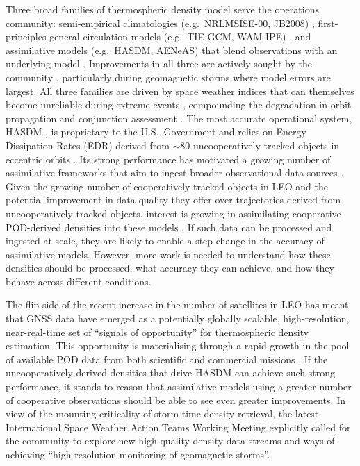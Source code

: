\documentclass[draft]{agujournal2019}
\begin{document}
Three broad families of thermospheric density model serve the operations community: semi-empirical climatologies (e.g.\ NRLMSISE-00, JB2008) \cite{Picone2002NRLMSISE-00Issues, Bowman2008AIndices}, first-principles general circulation models (e.g.\ TIE-GCM, WAM-IPE) \cite{Qian2014TheSystem, Brown2024UsingSolutions}, and assimilative models (e.g.\ HASDM, AENeAS) that blend observations with an underlying model \cite{Bruinsma2023ThermosphereDrag, Elvidge2019UsingModelling}. Improvements in all three are actively sought by the community \cite{Mutschler2023AOperations, Mehta2022SatelliteOperations}, particularly during geomagnetic storms where model errors are largest. All three families are driven by space weather indices that can themselves become unreliable during extreme events \cite{Shprits2019NowcastingObservations, Yamazaki2024AssessmentIndices}, compounding the degradation in orbit propagation and conjunction assessment \cite{Parker2024InfluencesAssessment}. The most accurate operational system, HASDM \cite{Storz2002HASDMRates, Picone2005ThermosphericSets}, is proprietary to the U.S.\ Government and relies on Energy Dissipation Rates (EDR) derived from $\sim$80 uncooperatively-tracked objects in eccentric orbits \cite{Storz2002HASDMRates}. Its strong performance has motivated a growing number of assimilative frameworks that aim to ingest broader observational data sources \cite{Sutton2018AThermosphere, Gondelach2020, Elvidge2019UsingModelling, Brown2024UsingSolutions}. Given the growing number of cooperatively tracked objects in LEO and the potential improvement in data quality they offer over trajectories derived from uncooperatively tracked objects, interest is growing in assimilating cooperative POD-derived densities into these models \cite{Mutschler2023Physics-BasedData, Fitzpatrick2024ApplyingSatellite}. If such data can be processed and ingested at scale, they are likely to enable a step change in the accuracy of assimilative models. However, more work is needed to understand how these densities should be processed, what accuracy they can achieve, and how they behave across different conditions.

The flip side of the recent increase in the number of satellites in LEO has meant that GNSS data have emerged as a potentially globally scalable, high-resolution, near-real-time set of “signals of opportunity” for thermospheric density estimation. This opportunity is materialising through a rapid growth in the pool of available POD data from both scientific and commercial missions \cite{Arnold2023PreciseSatellites, Schreiner2022GFZProducts, Mutschler2023Physics-BasedData, Fitzpatrick2024ApplyingSatellite}. 
If the uncooperatively-derived densities that drive HASDM can achieve such strong performance, it stands to reason that assimilative models using a greater number of cooperative observations should be able to see even greater improvements. In view of the mounting criticality of storm-time density retrieval, the latest International Space Weather Action Teams Working Meeting \cite{Mehta2022SatelliteOperations} explicitly called for the community to explore new high-quality density data streams and ways of achieving “high-resolution monitoring of geomagnetic storms”. 
\end{document}
